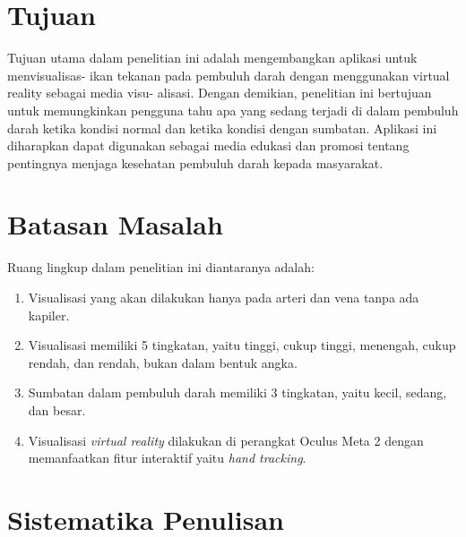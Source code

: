 \section{Tujuan}
\label{sec:Tujuan}

Tujuan utama dalam penelitian ini adalah mengembangkan aplikasi untuk menvisualisas- ikan tekanan pada pembuluh darah dengan menggunakan virtual reality sebagai media visu- alisasi. Dengan demikian, penelitian ini bertujuan untuk memungkinkan pengguna tahu apa yang sedang terjadi di dalam pembuluh darah ketika kondisi normal dan ketika kondisi dengan sumbatan. Aplikasi ini diharapkan dapat digunakan sebagai media edukasi dan promosi tentang pentingnya menjaga kesehatan pembuluh darah kepada masyarakat.






\section{Batasan Masalah}
\label{sec:batasanmasalah}

Ruang lingkup dalam penelitian ini diantaranya adalah:

\begin{enumerate}[nolistsep]

      \item Visualisasi yang akan dilakukan hanya pada arteri dan vena tanpa ada kapiler.
      \item Visualisasi memiliki 5 tingkatan, yaitu tinggi, cukup tinggi, menengah, cukup rendah, dan rendah, bukan dalam bentuk angka.
      \item Sumbatan dalam pembuluh darah memiliki 3 tingkatan, yaitu kecil, sedang, dan besar.
      \item Visualisasi \emph{virtual reality} dilakukan di perangkat Oculus Meta 2 dengan memanfaatkan fitur interaktif yaitu \emph{hand tracking}.

\end{enumerate}

\section{Sistematika Penulisan}
\label{sec:sistematikapenulisan}

